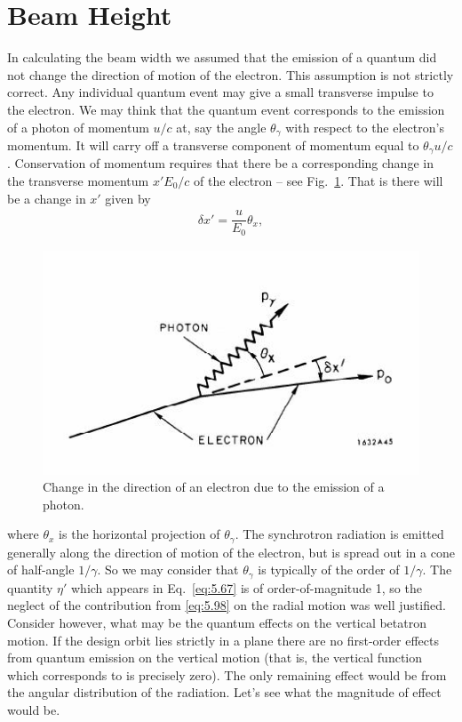 \section{Beam Height} \label{sec:5.6}

In calculating the beam width we assumed that the emission of a quantum did not change the direction of motion of the electron. This assumption is not strictly correct. Any individual
 quantum event may give a small transverse impulse to the electron. We may think that the quantum event corresponds to the emission of a photon of momentum $u/c$ at, say the angle $\theta_\gamma$ with respect to the electron's momentum. It will carry off a transverse component of momentum equal to $\theta_\gamma u/c$. Conservation of momentum requires that there be a corresponding
 change in the transverse momentum $x'E_0/c$ of the electron -- see Fig.~\ref{fig:fig45}. That is there will be a change in $x'$ given by
\begin{align} \label{eq:5.98}
	\delta x' = \dfrac{u}{E_0} \theta_{x},
\end{align}
\begin{figure}[!htb]
	\centering
	\includegraphics[width=0.8\linewidth]{./Figuras/fig45.jpeg}
	\caption{Change in the direction of an electron due to the emission of a photon.}
	\label{fig:fig45}
\end{figure}
where $\theta_x$ is the horizontal projection of $\theta_\gamma$. The synchrotron radiation
 is emitted generally along the direction of motion of the electron, but is spread out in a cone of half-angle $1/\gamma$. So we may consider that $\theta_\gamma$ is typically of the order of $1/\gamma$. The quantity $\eta'$ which appears in Eq.~\eqref{eq:5.67} is of order-of-magnitude
 1, so the neglect of the contribution from \eqref{eq:5.98} on the radial motion was well justified.\\
Consider however, what may be the quantum effects on the vertical betatron motion. If the design orbit lies strictly in a plane there are no first-order effects from quantum emission on the vertical motion (that is, the vertical function which corresponds to is precisely zero). The only remaining effect would be from the angular distribution of the radiation. Let's see what the magnitude of effect would be.\\
